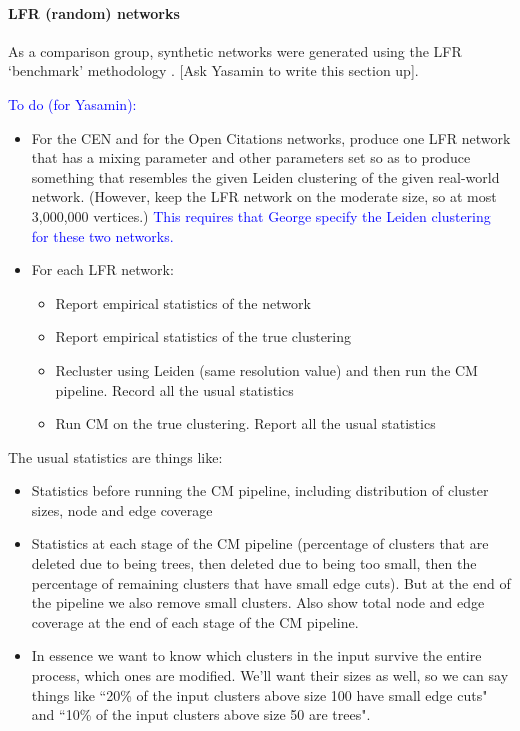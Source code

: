\documentclass[12pt, oneside]{article}   	%
\begin{document}
\paragraph{LFR (random) networks}
As a comparison group, synthetic networks were generated using the LFR `benchmark' methodology \citep{Lancichinetti2008}. [Ask Yasamin to write this section up].

\textcolor{blue}{
To do (for Yasamin):}

\begin{itemize}
\item For  the CEN and  for the Open Citations networks, produce one LFR network  that has a mixing parameter and other
parameters set so as to produce something that resembles the given Leiden clustering of the given real-world network. (However, keep the LFR network
on the moderate size, so at most 3,000,000 vertices.) 
\textcolor{blue}{This requires that George specify the Leiden clustering for these two networks.}
\item 
For each LFR network: 
\begin{itemize}
\item Report empirical statistics of the network
\item Report empirical statistics of the true clustering 
\item 
Recluster using Leiden (same resolution value) and then run the CM pipeline.
Record all the usual statistics
\item Run CM on the true clustering.
Report all the usual statistics
\end{itemize}
\end{itemize}

\noindent
The usual statistics are things like:
\begin{itemize}
\item Statistics before running the CM pipeline, including distribution of cluster sizes, node and edge coverage 
\item Statistics at each stage of the CM pipeline (percentage of clusters that are deleted due to being trees,
then deleted due to being too small, then the percentage of remaining clusters  that have small edge cuts).
But at the end of the pipeline we also remove small clusters.  
Also show total node and edge coverage at the end of each stage of the CM pipeline. 
\item 
In essence we want to know which clusters in the input survive the entire process, which ones are modified. 
We'll want their sizes as well, so we can say things like ``20\% of the input clusters above size 100 have small edge cuts" and
``10\% of the input clusters above size 50 are trees".
\end{itemize}
\end{document}
